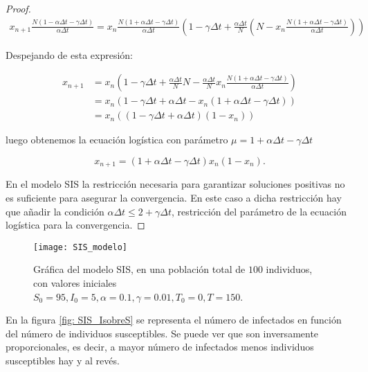 \begin{proof}
\begin{equation}
\begin{aligned}
x_{n+1}\frac{N(1-\alpha\Delta t-\gamma\Delta t)}{\alpha \Delta t} = x_n\frac{N(1+\alpha\Delta t-\gamma \Delta t)}{\alpha\Delta t}\left( 1-\gamma\Delta t+\frac{\alpha\Delta t}{N}\left(N-x_n\frac{N(1+\alpha\Delta t-\gamma\Delta t)}{\alpha\Delta t}\right) \right)
\end{aligned}
\end{equation}

Despejando de esta expresión:

\begin{equation}
\begin{aligned}
x_{n+1} & = x_n\left( 1-\gamma\Delta t+\frac{\alpha\Delta t}{N}N-\frac{\alpha\Delta t}{N}x_n\frac{N(1+\alpha\Delta t -\gamma \Delta t)}{\alpha\Delta t} \right) \\
& = x_n(1-\gamma\Delta t + \alpha\Delta t -x_n(1+\alpha\Delta t -\gamma\Delta t)) \\
& = x_n((1-\gamma\Delta t+\alpha\Delta t)(1-x_n))
\end{aligned}
\end{equation}

luego obtenemos la ecuación logística con parámetro $\mu = 1+\alpha\Delta t -\gamma \Delta t$

$$x_{n+1} = (1+\alpha \Delta t - \gamma \Delta t)x_n(1-x_n).$$

En el modelo SIS la restricción necesaria para garantizar soluciones positivas no es suficiente para asegurar la convergencia. En este caso a dicha restricción hay que añadir la condición $\alpha \Delta t \leq 2+\gamma \Delta t$, restricción del parámetro de la ecuación logística para la convergencia.

\end{proof}


\begin{figure}
\begin{center}
\caption{Gráfica del modelo SIS, en una población total de $100$ individuos, con valores iniciales $S_0=95, I_0 = 5, \alpha = 0.1, \gamma=0.01, T_0 = 0, T = 150$.}
\texttt{[image: SIS\_modelo]}
\end{center}
\end{figure}

En la figura \eqref{fig: SIS_IsobreS} se representa el número de infectados en función del número de individuos susceptibles. Se puede ver que son inversamente proporcionales, es decir, a mayor número de infectados menos individuos susceptibles hay y al revés.

